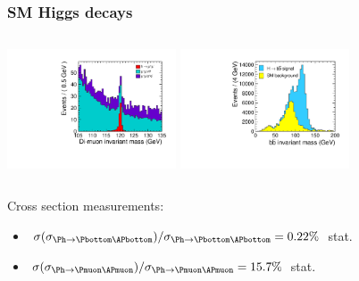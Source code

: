 \documentclass{beamer}
\begin{document}
\begin{frame}
\frametitle{SM Higgs decays}
\begin{columns}[c]
\column{6cm}
\centering
\includegraphics[width=5cm]{ee_h_mumu_mass_mh120GeV}
\column{6cm}
\centering
\includegraphics[width=5cm]{ee_h_bb_mass_mh120GeV}
\end{columns}
Cross section measurements:
\begin{itemize}
  \item
  $\sigma(\sigma_{\Ph\to\Pbottom\APbottom})/\sigma_{\Ph\to\Pbottom\APbottom} =
  0.22\%$ stat.
  \item $\sigma(\sigma_{\Ph\to\Pmuon\APmuon})/\sigma_{\Ph\to\Pmuon\APmuon}
  = 15.7\%$ stat.
\end{itemize}
\end{frame}
\end{document}
